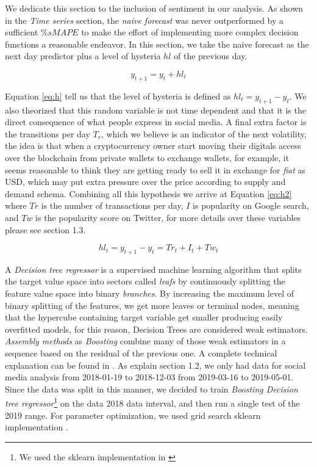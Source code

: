 We dedicate this section to the inclusion of sentiment in our analysis. As shown in the \emph{Time series} section, the \emph{naive forecast} was never outperformed by a sufficient  $\% sMAPE$  to make the effort of implementing more complex decision functions a reasonable endeavor. In this section, we take the naive forecast as the next day predictor plus a level of hysteria  $hl$ of the previous day.

\begin{equation}
y_{t+1}=y_{t}+ hl_{t}
\label{eq:h}
\end{equation}

Equation \ref{eq:h} tell us that the level of hysteria is defined as $hl_{t}=y_{t+1}-y_{t}$. We also theorized that this random variable is not time dependent and that it is the direct consequence of what people express in social media. A final extra factor is the transitions per day $T_{r}$, which we believe is an indicator of the next volatility, the idea is that when a cryptocurrency owner start moving their digitals access over the blockchain from private wallets to exchange wallets, for example, it seems reasonable to think they are getting ready to sell it in exchange for \emph{fiat} as USD, which may put extra pressure over the price according to supply and demand schema. Combining all this hypothesis we arrive at Equation \ref{eq:h2} where $Tr$ is the number of transactions per day, $I$ is popularity on Google search, and $Tw$ is the popularity score on Twitter, for more details over these variables please see section 1.3.

\begin{equation}
hl_{t}=y_{t+1}-y_{t}=Tr_{t}+I_{t}+Tw_{t}
\label{eq:h2}
\end{equation}



A \emph{Decision tree regressor} is a supervised machine learning algorithm that splits the target value space into sectors called \emph{leafs} by continuously splitting the feature value space into binary \emph{branches}. By increasing the maximum level of binary splitting of the features, we get more leaves or terminal nodes, meaning that the hypercube containing target variable get smaller producing easily overfitted models, for this reason, Decision Trees are considered weak estimators. \emph{Assembly methods} as \emph{Boosting} combine many of those weak estimators in a sequence based on the residual of the previous one. A complete technical explanation can be found in \cite{james2013introduction}. As explain section 1.2, we only had data for social media analysis from 2018-01-19 to 2018-12-03 from 2019-03-16 to 2019-05-01. Since the data was split in this manner, we decided to train \emph{Boosting Decision tree regressor}\footnote{ We used the sklearn implementation in \cite{scikitlearn_bo} } on the data 2018 data interval, and then run a single test of the 2019 range. For parameter optimization, we used grid search sklearn implementation \cite{scikitlearn_grid}.\\

